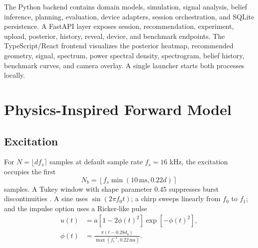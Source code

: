 \documentclass[conference]{IEEEtran}
\begin{document}
The Python backend contains domain models, simulation, signal analysis, belief inference, planning, evaluation, device adapters, session orchestration, and SQLite persistence. A FastAPI layer exposes session, recommendation, experiment, upload, posterior, history, reveal, device, and benchmark endpoints. The TypeScript/React frontend visualizes the posterior heatmap, recommended geometry, signal, spectrum, power spectral density, spectrogram, belief history, benchmark curves, and camera overlay. A single launcher starts both processes locally.

\section{Physics-Inspired Forward Model}
\subsection{Excitation}
For $N=\lfloor d f_s\rceil$ samples at default sample rate $f_s=16$ kHz, the excitation occupies the first
\begin{equation}
 N_b=\left\lfloor f_s\min(10\,\mathrm{ms},0.22d)\right\rceil
\end{equation}
samples. A Tukey window with shape parameter 0.45 suppresses burst discontinuities \cite{harris1978}. A sine uses $\sin(2\pi f_0t)$; a chirp sweeps linearly from $f_0$ to $f_1$; and the impulse option uses a Ricker-like pulse
\begin{align}
 u(t)&=a[1-2\phi(t)^2]\exp[-\phi(t)^2],\\
 \phi(t)&=\frac{\pi(t-0.28d_b)}{\max(f_c^{-1},0.22\,\mathrm{ms})}.
\end{align}
\end{document}
